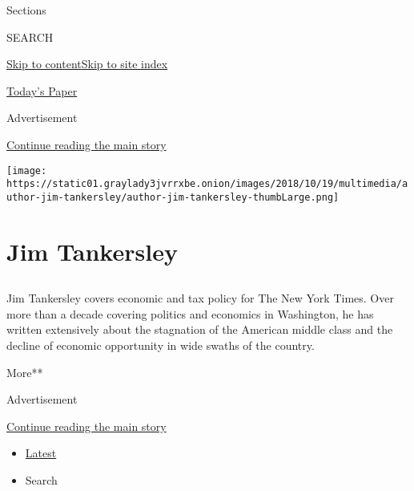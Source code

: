 Sections

SEARCH

\protect\hyperlink{site-content}{Skip to
content}\protect\hyperlink{site-index}{Skip to site index}

\href{https://myaccount.nytimes3xbfgragh.onion/auth/login?response_type=cookie\&client_id=vi}{}

\href{https://www.nytimes3xbfgragh.onion/section/todayspaper}{Today's
Paper}

Advertisement

\protect\hyperlink{after-top}{Continue reading the main story}

\texttt{[image: https://static01.graylady3jvrrxbe.onion/images/2018/10/19/multimedia/author-jim-tankersley/author-jim-tankersley-thumbLarge.png]}

\hypertarget{jim-tankersley}{%
\section{Jim Tankersley}\label{jim-tankersley}}

\subsection{}

Jim Tankersley covers economic and tax policy for The New York Times.
Over more than a decade covering politics and economics in Washington,
he has written extensively about the stagnation of the American middle
class and the decline of economic opportunity in wide swaths of the
country.

More**

Advertisement

\protect\hyperlink{after-mid1}{Continue reading the main story}

\begin{itemize}
\tightlist
\item
  \protect\hyperlink{stream-panel}{Latest}
\item
  Search
\end{itemize}

